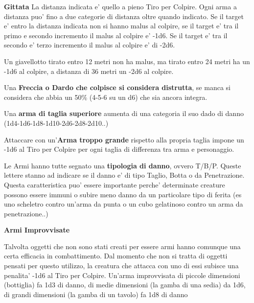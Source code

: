 \documentclass[a4paper,11pt,twoside,openany]{book}
\begin{document}
{\bigskip

\textbf{Gittata}
La distanza indicata e' quello a pieno Tiro per Colpire. Ogni arma a distanza puo' fino a due categorie di distanza oltre quando indicato. Se il target e' entro la distanza indicata non si hanno malus al colpire, se il target e' tra il primo e secondo incremento il malus al colpire e' -1d6. Se il target e' tra il secondo e' terzo incremento il malus al colpire e' di -2d6.

Un giavellotto tirato entro 12 metri non ha malus, ma tirato entro 24 metri ha un -1d6 al colpire, a distanza di 36 metri un -2d6 al colpire.

\medskip


Una \textbf{Freccia o Dardo che colpisce si considera distrutta}, se manca si considera che abbia un 50\% (4-5-6 su un d6) che sia ancora integra.

\medskip

Una \textbf{arma di taglia superiore} aumenta di una categoria il suo dado di danno (1d4-1d6-1d8-1d10-2d6-2d8-2d10..)

\medskip

Attaccare con un'\textbf{Arma troppo grande} rispetto alla propria taglia impone un -1d6 al Tiro per Colpire per ogni taglia di differenza tra arma e personaggio.

\medskip

Le Armi hanno tutte segnato una \textbf{tipologia di danno}, ovvero T/B/P. 	Queste lettere stanno ad indicare se il danno e' di tipo Taglio, Botta 	o da Penetrazione. Questa caratteristica puo' essere importante perche' 	determinate creature possono essere immuni o subire meno danno da 	un particolare tipo di ferita (es uno scheletro contro un'arma da 	punta o un cubo gelatinoso contro un arma da penetrazione..)

\medskip

\textbf{Armi Improvvisate}
	
Talvolta oggetti che non sono stati creati per essere armi hanno comunque una certa efficacia in combattimento. Dal momento che non si tratta di oggetti pensati per questo utilizzo, la creatura che attacca con uno di essi subisce una penalita' -1d6 al Tiro per Colpire. Un'arma improvvisata di piccole dimensioni (bottiglia) fa 1d3 di danno, di medie dimensioni (la gamba di una sedia) da 1d6, di grandi dimensioni (la gamba di un tavolo) fa 1d8 di danno
	
}
\end{document}
